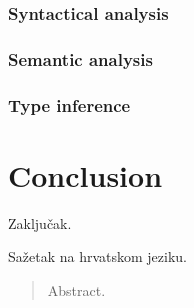 \documentclass[times, utf8, diplomski]{fer}
\begin{document}
\subsection{Syntactical analysis}

\subsection{Semantic analysis}

\subsection{Type inference}





\chapter{Conclusion}
Zaključak.




\begin{sazetak}
Sažetak na hrvatskom jeziku.

\end{sazetak}

\begin{abstract}
Abstract.

\end{abstract}
\end{document}
